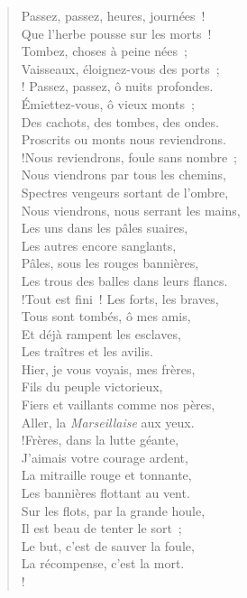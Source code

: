 \documentclass[french,twoside]{book} %
\newcommand{\astertri}{\medskip\par\centerline{\color{rubric}\large\selectfont{\syms ✻\,✻\,✻}}\medskip\par}%
\newenvironment{quoteblock}%
  {\begin{quoting}}
  {\end{quoting}}
\newenvironment{quotebar}{%
    \def\FrameCommand{{\color{rubric!10!}\vrule width 0.5em} \hspace{0.9em}}%
    \def\OuterFrameSep{\itemsep} %
    \MakeFramed {\advance\hsize-\width \FrameRestore}
  }%
  {%
    \endMakeFramed
  }
\renewenvironment{quoteblock}%
  {%
    \savenotes
    \setstretch{0.9}
    \normalfont
    \begin{quotebar}
  }
  {%
    \end{quotebar}
    \spewnotes
  }
\begin{document}
\begin{verse}
Passez, passez, heures, journées !\\
Que l’herbe pousse sur les morts !\\
Tombez, choses à peine nées ;\\
Vaisseaux, éloignez-vous des ports ;\\! Passez, passez, ô nuits profondes.\\
Émiettez-vous, ô vieux monts ;\\
Des cachots, des tombes, des ondes.\\
Proscrits ou monts nous reviendrons.\\!Nous reviendrons, foule sans nombre ;\\
Nous viendrons par tous les chemins, \\
Spectres vengeurs sortant de l’ombre, \\
Nous viendrons, nous serrant les mains,\\
Les uns dans les pâles suaires,\\
Les autres encore sanglants,\\
Pâles, sous les rouges bannières,\\
Les trous des balles dans leurs flancs.\\!Tout est fini ! Les forts, les braves,\\
Tous sont tombés, ô mes amis,\\
Et déjà rampent les esclaves,\\
Les traîtres et les avilis.\\
Hier, je vous voyais, mes frères,\\
Fils du peuple victorieux,\\
Fiers et vaillants comme nos pères, \\
Aller, la \emph{Marseillaise} aux yeux.\\!Frères, dans la lutte géante,\\
J’aimais votre courage ardent,\\
La mitraille rouge et tonnante,\\
Les bannières flottant au vent.\\
Sur les flots, par la grande houle,\\
Il est beau de tenter le sort ;\\
Le but, c’est de sauver la foule,\\
La récompense, c’est la mort.\\!
\end{verse}
\begin{quoteblock}

\astertri

 \end{quoteblock}
\end{document}
